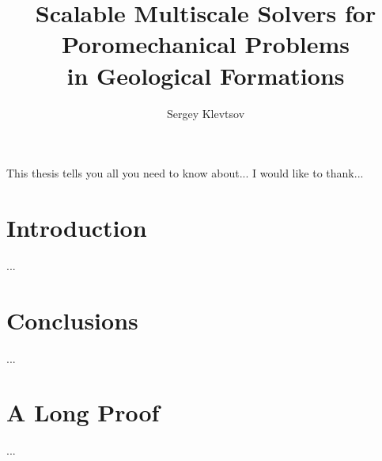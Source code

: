 \documentclass{report}
\begin{document}
\title{Scalable Multiscale Solvers for Poromechanical Problems\\
in Geological Formations}
\author{Sergey Klevtsov}
 
\beforepreface
{}
This thesis tells you all you need to know about...
I would like to thank...
\afterpreface

\chapter{Introduction}
...
\chapter{Conclusions}
...
\appendix
\chapter{A Long Proof}
...


\end{document}
